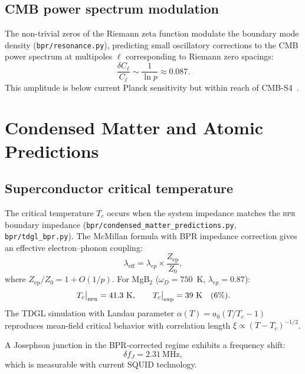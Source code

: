 \documentclass[aps,prd,twocolumn,superscriptaddress,longbibliography,nofootinbib]{revtex4-2}
\newcommand{\Zimp}{Z}
\newcommand{\Zvac}{Z_0}
\newcommand{\bpr}{\textsc{bpr}}
\begin{document}
\subsection{CMB power spectrum modulation}

The non-trivial zeros of the Riemann zeta function modulate the
boundary mode density (\texttt{bpr/resonance.py}), predicting small
oscillatory corrections to the CMB power spectrum at multipoles
$\ell$ corresponding to Riemann zero spacings:
\begin{equation}
\frac{\delta C_\ell}{C_\ell} \sim \frac{1}{\ln p} \approx 0.087.
\label{eq:cmb_mod}
\end{equation}
This amplitude is below current Planck sensitivity but within reach
of CMB-S4~\cite{CMBS4}.


\section{Condensed Matter and Atomic Predictions}
\label{sec:cmat}

\subsection{Superconductor critical temperature}

The critical temperature $T_c$ occurs when the system impedance
matches the \bpr{} boundary impedance
(\texttt{bpr/condensed\_matter\_predictions.py},
\texttt{bpr/tdgl\_bpr.py}).  The McMillan formula with BPR
impedance correction gives an effective electron--phonon coupling:
\begin{equation}
\lambda_{\mathrm{eff}} = \lambda_{ep} \times
  \frac{\Zimp_{\mathrm{ep}}}{\Zvac},
\label{eq:lambda_eff}
\end{equation}
where $\Zimp_{\mathrm{ep}}/\Zvac = 1 + O(1/p)$.  For MgB$_2$
($\omega_D = 750$~K, $\lambda_{ep} = 0.87$):
\begin{equation}
T_c\big|_{\bpr} = 41.3~\text{K}, \qquad
T_c\big|_{\mathrm{exp}} = 39~\text{K} \quad (6\%).
\label{eq:Tc_mgb2}
\end{equation}
The TDGL simulation with Landau parameter $\alpha(T) = a_0(T/T_c -
1)$ reproduces mean-field critical behavior with correlation length
$\xi \propto (T - T_c)^{-1/2}$.

A Josephson junction in the BPR-corrected regime exhibits a
frequency shift:
\begin{equation}
\delta f_J = 2.31~\text{MHz},
\label{eq:josephson}
\end{equation}
which is measurable with current SQUID technology.
\end{document}
